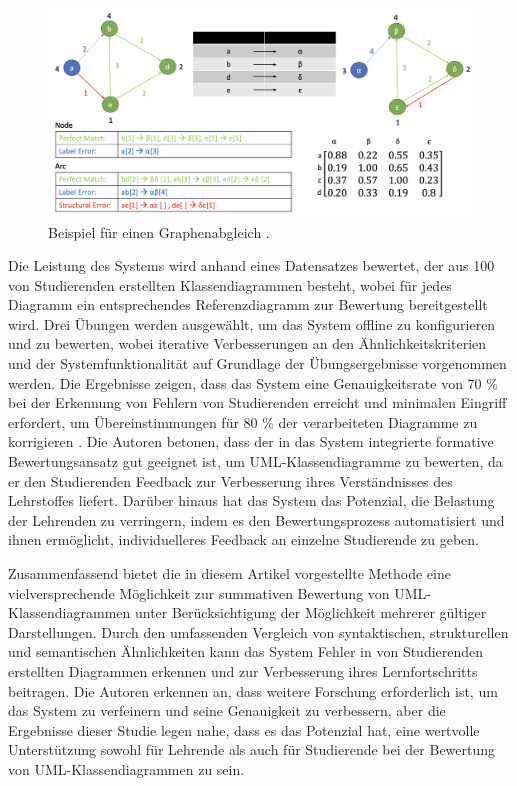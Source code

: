 \begin{figure}
	\centering
	\includegraphics[width=15cm]{images/graph-matching.png}
	\caption{Beispiel für einen Graphenabgleich \cite{anas2021new}.}
	\label{fig:graph-matching}
\end{figure}

Die Leistung des Systems wird anhand eines Datensatzes bewertet, der aus 100 von Studierenden erstellten Klassendiagrammen besteht, wobei für jedes Diagramm ein entsprechendes Referenzdiagramm zur Bewertung bereitgestellt wird. Drei Übungen werden ausgewählt, um das System offline zu konfigurieren und zu bewerten, wobei iterative Verbesserungen an den Ähnlichkeitskriterien und der Systemfunktionalität auf Grundlage der Übungsergebnisse vorgenommen werden. Die Ergebnisse zeigen, dass das System eine Genauigkeitsrate von 70 \% bei der Erkennung von Fehlern von Studierenden erreicht und minimalen Eingriff erfordert, um Übereinstimmungen für 80 \% der verarbeiteten Diagramme zu korrigieren \cite{anas2021new}. Die Autoren betonen, dass der in das System integrierte formative Bewertungsansatz gut geeignet ist, um UML-Klassendiagramme zu bewerten, da er den Studierenden Feedback zur Verbesserung ihres Verständnisses des Lehrstoffes liefert. Darüber hinaus hat das System das Potenzial, die Belastung der Lehrenden zu verringern, indem es den Bewertungsprozess automatisiert und ihnen ermöglicht, individuelleres Feedback an einzelne Studierende zu geben.

Zusammenfassend bietet die in diesem Artikel vorgestellte Methode eine vielversprechende Möglichkeit zur summativen Bewertung von UML-Klassendiagrammen unter Berücksichtigung der Möglichkeit mehrerer gültiger Darstellungen. Durch den umfassenden Vergleich von syntaktischen, strukturellen und semantischen Ähnlichkeiten kann das System Fehler in von Studierenden erstellten Diagrammen erkennen und zur Verbesserung ihres Lernfortschritts beitragen. Die Autoren erkennen an, dass weitere Forschung erforderlich ist, um das System zu verfeinern und seine Genauigkeit zu verbessern, aber die Ergebnisse dieser Studie legen nahe, dass es das Potenzial hat, eine wertvolle Unterstützung sowohl für Lehrende als auch für Studierende bei der Bewertung von UML-Klassendiagrammen zu sein.

